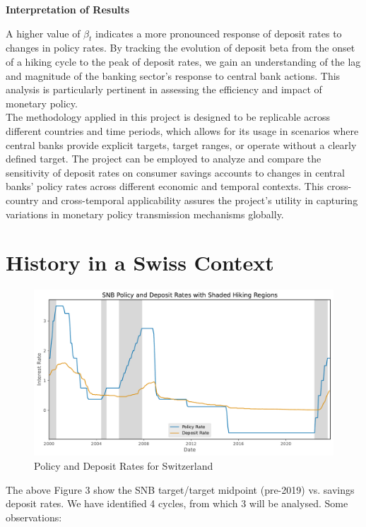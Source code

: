 \documentclass{article}
\begin{document}
\textbf{Interpretation of Results}

A higher value of \( \beta_t \) indicates a more pronounced response of deposit rates to changes in policy rates. By tracking the evolution of deposit beta from the onset of a hiking cycle to the peak of deposit rates, we gain an understanding of the lag and magnitude of the banking sector's response to central bank actions. This analysis is particularly pertinent in assessing the efficiency and impact of monetary policy.\\

The methodology applied in this project is designed to be replicable across different countries and time periods, which allows for its usage in scenarios where central banks provide explicit targets, target ranges, or operate without a clearly defined target. The project can be employed to analyze and compare the sensitivity of deposit rates on consumer savings accounts to changes in central banks’ policy rates across different economic and temporal contexts. This cross-country and cross-temporal applicability assures the project's utility in capturing variations in monetary policy transmission mechanisms globally.\\

\section{History in a Swiss Context}

\begin{figure}[h]
    \centering
    \includegraphics[width=1\textwidth]{../../figures/rates_shaded_SNB.pdf}
    \caption{Policy and Deposit Rates for Switzerland}
    \label{fig:rates_shaded}
\end{figure}

The above Figure 3 show the SNB target/target midpoint (pre-2019) vs. savings deposit rates. We have identified 4 cycles, from which 3 will be analysed. Some observations:
\end{document}
